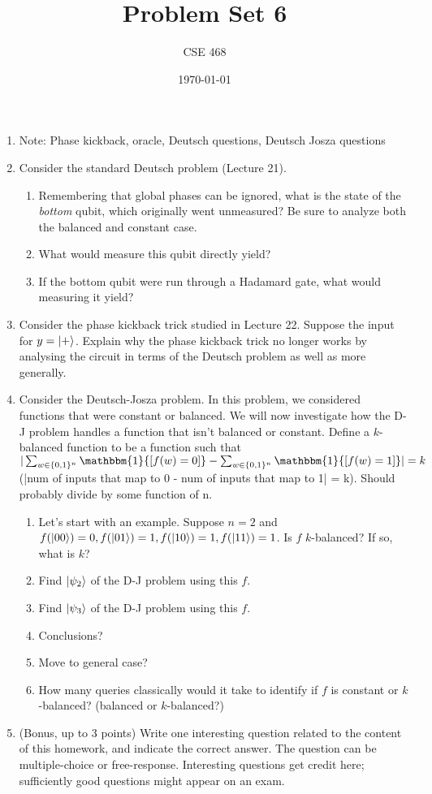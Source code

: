 \documentclass[12pt]{article}
\title{Problem Set 6}
\author{CSE 468}
\date{\today}
\begin{document}
\maketitle



\begin{enumerate}[font=\bfseries]

    \item Note: Phase kickback, oracle, Deutsch questions, Deutsch Josza questions
    \item Consider the standard Deutsch problem (Lecture 21).
    \begin{enumerate}
        \item Remembering that global phases can be ignored, what is the state of the \emph{bottom} qubit, which originally went unmeasured? Be sure to analyze both the balanced and constant case.
        \item What would measure this qubit directly yield?
        \item If the bottom qubit were run through a Hadamard gate, what would measuring it yield?
    \end{enumerate}
    \item Consider the phase kickback trick studied in Lecture 22. Suppose the input for $y = \ket{+}$. Explain why the phase kickback trick no longer works by analysing the circuit in terms of the Deutsch problem as well as more generally.
    \item Consider the Deutsch-Josza problem. In this problem, we considered functions that were constant or balanced. We will now investigate how the D-J problem handles a function that isn't balanced or constant. Define a $k$-balanced function to be a function such that $|\sum_{w\in\{0,1\}^n} \mathbbm{1}{[f(w) = 0]} - \sum_{w\in\{0,1\}^n} \mathbbm{1}{[f(w) = 1]}| = k$ (|num of inputs that map to 0 - num of inputs that map to 1| = k). Should probably divide by some function of n.
    \begin{enumerate}
        \item Let's start with an example. Suppose $n = 2$ and $f(\ket{00}) = 0, f(\ket{01}) = 1, f(\ket{10}) = 1, f(\ket{11}) = 1$. Is $f$ $k$-balanced? If so, what is $k$?
        \item Find $\ket{\psi_2}$ of the D-J problem using this $f$.
        \item Find $\ket{\psi_3}$ of the D-J problem using this $f$.
        \item Conclusions?
        \item Move to general case?
        \item How many queries classically would it take to identify if $f$ is constant or $k$-balanced? (balanced or $k$-balanced?)
    \end{enumerate}
    \item (Bonus, up to 3 points) Write one interesting question related to the content of this homework, and indicate the correct answer. The question can be multiple-choice or free-response.  Interesting questions get credit here;  sufficiently good questions might appear on an exam.
\end{enumerate}
\end{document}
